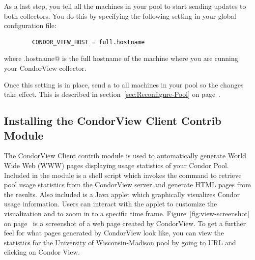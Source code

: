 As a last step, you tell all the machines in your pool to start sending
updates to both collectors.
You do this by specifying the following setting in your global
configuration file:
\begin{verbatim}
        CONDOR_VIEW_HOST = full.hostname
\end{verbatim}
where \verb@full.hostname@ is the full hostname of the machine where you
are running your CondorView collector.

Once this setting is in place, send a
 to all machines in your pool so the changes take
effect.
This is described in section~\ref{sec:Reconfigure-Pool} on
page~\pageref{sec:Reconfigure-Pool}.

\subsection{\label{sec:CondorView-Client-Install}
Installing the CondorView Client Contrib Module} 

\newcommand{\MakeStats}{\Prog{make\_stats}}

The CondorView Client contrib module is used to automatically generate
World Wide Web (WWW) pages displaying usage statistics of your Condor
Pool.
Included in the module is a shell script which invokes the 
command to retrieve pool usage statistics from the CondorView server and
generate HTML pages from the results.  
Also included is a Java applet which graphically visualizes Condor 
usage information.  
Users can interact with the applet to customize the visualization and to
zoom in to a specific time frame.
Figure~\ref{fig:view-screenshot} on page~\pageref{fig:view-screenshot}
is a screenshot of a web page created by CondorView.  
To get a further feel for what pages generated by CondorView look like,
you can view the statistics for the University of Wisconsin-Madison pool
by going to URL  and clicking on
Condor View.

